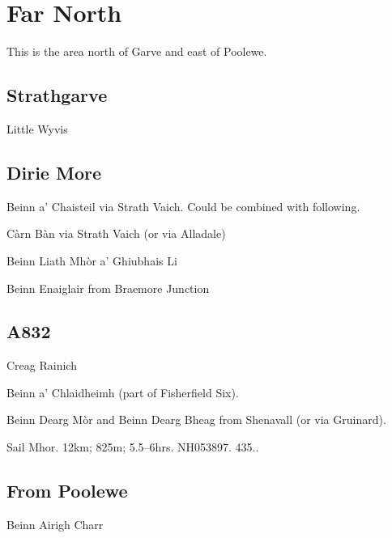 \section{Far North}

This is the area north of Garve and east of Poolewe. 

\subsection{Strathgarve}

Little Wyvis


\subsection{Dirie More}

Beinn a' Chaisteil via Strath Vaich.  Could be combined with following. 

Càrn Bàn via Strath Vaich (or via Alladale)

Beinn Liath Mhòr a' Ghiubhais Li


Beinn Enaiglair from Braemore Junction


\subsection{A832}

\begin{munros}
\item
Creag Rainich

\item \target
Beinn a' Chlaidheimh (part of Fisherfield Six).

\item \target
Beinn Dearg Mòr and Beinn Dearg Bheag from Shenavall (or via Gruinard).

\item  \target
Sail Mhor.  12km; 825m; 5.5--6hrs.  NH053897.  435..
\end{munros}


\subsection{From Poolewe}

Beinn Airigh Charr

